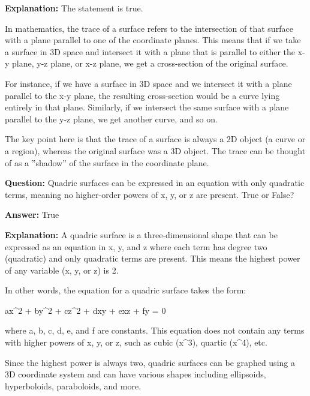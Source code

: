 \documentclass{article}
\begin{document}
                \textbf{Explanation:} The statement is true.

In mathematics, the trace of a surface refers to the intersection of that surface with a plane parallel to one of the coordinate planes. This means that if we take a surface in 3D space and intersect it with a plane that is parallel to either the x-y plane, y-z plane, or x-z plane, we get a cross-section of the original surface.

For instance, if we have a surface in 3D space and we intersect it with a plane parallel to the x-y plane, the resulting cross-section would be a curve lying entirely in that plane. Similarly, if we intersect the same surface with a plane parallel to the y-z plane, we get another curve, and so on.

The key point here is that the trace of a surface is always a 2D object (a curve or a region), whereas the original surface was a 3D object. The trace can be thought of as a ''shadow'' of the surface in the coordinate plane.
                
                \vspace{0.5cm} 
        
            
                \textbf {Question:} Quadric surfaces can be expressed in an equation with only quadratic terms, meaning no higher-order powers of x, y, or z are present. True or False?
                
                \textbf{Answer:} True

                \textbf{Explanation:} A quadric surface is a three-dimensional shape that can be expressed as an equation in x, y, and z where each term has degree two (quadratic) and only quadratic terms are present. This means the highest power of any variable (x, y, or z) is 2.

In other words, the equation for a quadric surface takes the form:

ax{\textasciicircum}2 + by{\textasciicircum}2 + cz{\textasciicircum}2 + dxy + exz + fy = 0

where a, b, c, d, e, and f are constants. This equation does not contain any terms with higher powers of x, y, or z, such as cubic (x{\textasciicircum}3), quartic (x{\textasciicircum}4), etc.

Since the highest power is always two, quadric surfaces can be graphed using a 3D coordinate system and can have various shapes including ellipsoids, hyperboloids, paraboloids, and more.
                
                \vspace{0.5cm} 
        
\end{document}
